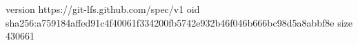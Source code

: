 version https://git-lfs.github.com/spec/v1
oid sha256:a759184affed91c4f40061f334200fb5742e932b46f046b666bc98d5a8abbf8e
size 430661
